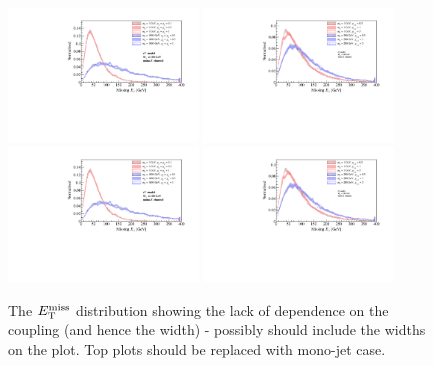 \begin{figure}[t]
  \begin{center}
    \includegraphics[width=0.45\textwidth]{figures/SVD_MET.pdf}
    \includegraphics[width=0.45\textwidth]{figures/TSD_MET.pdf}
    \includegraphics[width=0.45\textwidth]{figures/SVD_MET.pdf}
    \includegraphics[width=0.45\textwidth]{figures/TSD_MET.pdf}
    \caption{The $E_{\mathrm{T}}^{\mathrm{miss}}$ distribution showing the lack of dependence on the coupling (and hence the width) - possibly should include the widths on the plot. Top plots should be replaced with mono-jet case.}
    \label{MET_SVD_monoZ}
  \end{center}
\end{figure}

